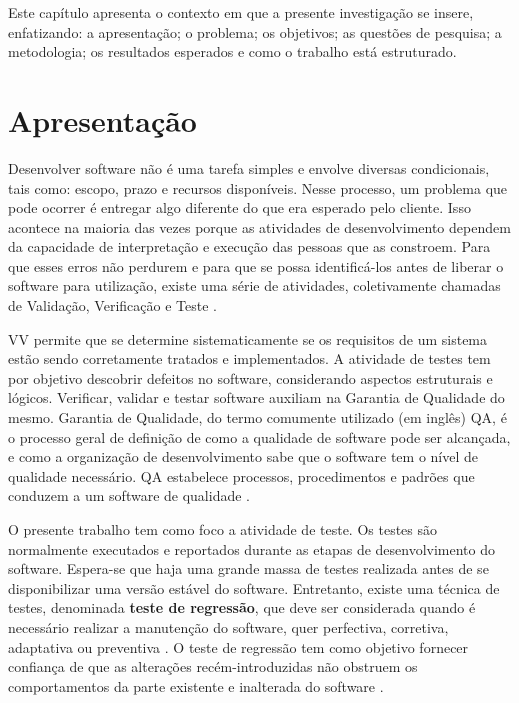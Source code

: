 
\acresetall 


Este capítulo apresenta o contexto em que a presente investigação se insere, enfatizando: a apresentação; o problema; os objetivos; as questões de pesquisa; a metodologia; os resultados esperados e como o trabalho está estruturado.

\section{Apresentação}\label{sec:apresentacao}
Desenvolver software não é uma tarefa simples e envolve diversas condicionais, tais como: escopo, prazo e recursos disponíveis. Nesse processo, um problema que pode ocorrer é entregar algo diferente do que era esperado pelo cliente. Isso acontece na maioria das vezes porque as atividades de desenvolvimento dependem da capacidade de interpretação e execução das pessoas que as constroem. Para que esses erros não perdurem e para que se possa identificá-los antes de liberar o software para utilização, existe uma série de atividades, coletivamente chamadas de Validação, Verificação e Teste \cite{DELAMARO2007}. 

\ac{VV} permite que se determine sistematicamente se os requisitos de um sistema estão sendo corretamente tratados e implementados. A atividade de testes tem por objetivo descobrir defeitos no software, considerando aspectos estruturais e lógicos. Verificar, validar e testar software auxiliam na Garantia de Qualidade do mesmo. Garantia de Qualidade, do termo comumente utilizado (em inglês) \ac{QA}, é o processo geral de definição de como a qualidade de software pode ser alcançada, e como a organização de desenvolvimento sabe que o software tem o nível de qualidade necessário. \ac{QA} estabelece processos, procedimentos e padrões que conduzem a um software de qualidade \cite{HIRAMA2011}. 

O presente trabalho tem como foco a atividade de teste. Os testes são normalmente executados e reportados durante as etapas de desenvolvimento do software. Espera-se que haja uma grande massa de testes realizada antes de se disponibilizar uma versão estável do software. Entretanto, existe uma técnica de testes, denominada \textbf{teste de regressão}, que deve ser considerada quando é necessário realizar a manutenção do software, quer perfectiva, corretiva, adaptativa ou preventiva \cite{DBLP:series/springer/Mens08}. O teste de regressão tem como objetivo fornecer confiança de que as alterações recém-introduzidas não obstruem os comportamentos da parte existente e inalterada do software \cite{Yoo:2012:RTM:2284811.2284813}.

